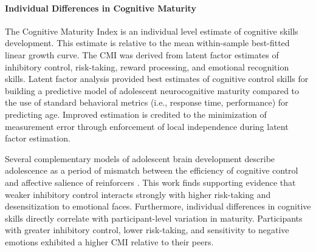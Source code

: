 \documentclass{article}%
\begin{document}
\paragraph*{Individual Differences in Cognitive Maturity}
The Cognitive Maturity Index is an individual level estimate of cognitive skills development. This estimate is relative to the mean within-sample best-fitted linear growth curve. The CMI was derived from latent factor estimates of inhibitory control, risk-taking, reward processing, and emotional recognition skills. Latent factor analysis provided best estimates of cognitive control skills for building a predictive model of adolescent neurocognitive maturity compared to the use of standard behavioral metrics (i.e., response time, performance) for predicting age. Improved estimation is credited to the minimization of measurement error through enforcement of local independence during latent factor estimation. 

Several complementary models of adolescent brain development describe adolescence as a period of mismatch between the efficiency of cognitive control and affective salience of reinforcers \citep{CaseyEtAl2008, LunaWright2016}. This work finds supporting evidence that weaker inhibitory control interacts strongly with higher risk-taking and desensitization to emotional faces. Furthermore, individual differences in cognitive skills directly correlate with participant-level variation in maturity. Participants with greater inhibitory control, lower risk-taking, and sensitivity to negative emotions exhibited a higher CMI relative to their peers. 
\end{document}
